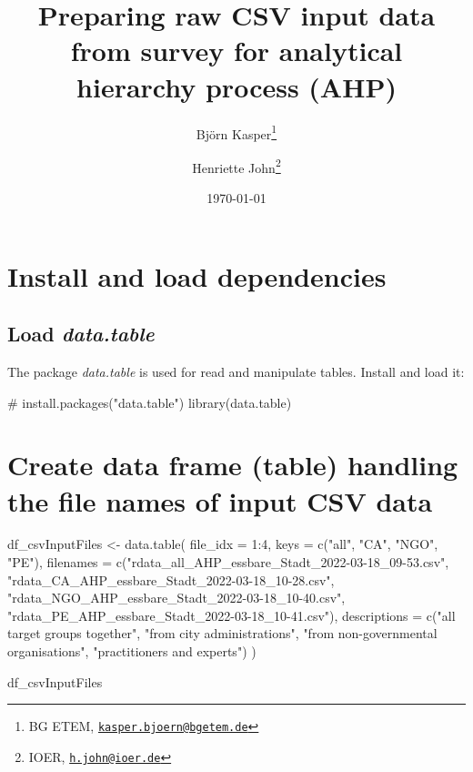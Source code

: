 \documentclass[
]{article}
\title{Preparing raw CSV input data from survey for analytical hierarchy
process (AHP)}
\author{Björn Kasper\footnote{BG ETEM,
  \href{mailto:kasper.bjoern@bgetem.de}{\nolinkurl{kasper.bjoern@bgetem.de}}} \and Henriette
John\footnote{IOER,
  \href{mailto:h.john@ioer.de}{\nolinkurl{h.john@ioer.de}}}}
\date{\today}
\newenvironment{Shaded}{\begin{snugshade}}{\end{snugshade}}
\newcommand{\AttributeTok}[1]{\textcolor[rgb]{0.00,0.34,0.68}{#1}}
\newcommand{\CommentTok}[1]{\textcolor[rgb]{0.54,0.53,0.53}{#1}}
\newcommand{\DecValTok}[1]{\textcolor[rgb]{0.69,0.50,0.00}{#1}}
\newcommand{\FunctionTok}[1]{\textcolor[rgb]{0.39,0.29,0.61}{#1}}
\newcommand{\NormalTok}[1]{\textcolor[rgb]{0.12,0.11,0.11}{#1}}
\newcommand{\OtherTok}[1]{\textcolor[rgb]{0.00,0.43,0.16}{#1}}
\newcommand{\SpecialCharTok}[1]{\textcolor[rgb]{0.24,0.68,0.91}{#1}}
\newcommand{\StringTok}[1]{\textcolor[rgb]{0.75,0.01,0.01}{#1}}
\begin{document}
\maketitle

{
\setcounter{tocdepth}{2}
\tableofcontents
}
\hypertarget{install-and-load-dependencies}{%
\section{Install and load
dependencies}\label{install-and-load-dependencies}}

\hypertarget{load-data.table}{%
\subsection{\texorpdfstring{Load
\emph{data.table}}{Load data.table}}\label{load-data.table}}

The package \emph{data.table} is used for read and manipulate tables.
Install and load it:

\begin{Shaded}
\begin{Highlighting}[]
\CommentTok{\# install.packages("data.table")}
\FunctionTok{library}\NormalTok{(data.table)}
\end{Highlighting}
\end{Shaded}

\hypertarget{create-data-frame-table-handling-the-file-names-of-input-csv-data}{%
\section{Create data frame (table) handling the file names of input CSV
data}\label{create-data-frame-table-handling-the-file-names-of-input-csv-data}}

\begin{Shaded}
\begin{Highlighting}[]
\NormalTok{df\_csvInputFiles }\OtherTok{\textless{}{-}} \FunctionTok{data.table}\NormalTok{(}
  \AttributeTok{file\_idx =} \DecValTok{1}\SpecialCharTok{:}\DecValTok{4}\NormalTok{,}
  \AttributeTok{keys =} \FunctionTok{c}\NormalTok{(}\StringTok{"all"}\NormalTok{, }\StringTok{"CA"}\NormalTok{, }\StringTok{"NGO"}\NormalTok{, }\StringTok{"PE"}\NormalTok{),}
  \AttributeTok{filenames =} \FunctionTok{c}\NormalTok{(}\StringTok{"rdata\_all\_AHP\_essbare\_Stadt\_2022{-}03{-}18\_09{-}53.csv"}\NormalTok{,}
               \StringTok{"rdata\_CA\_AHP\_essbare\_Stadt\_2022{-}03{-}18\_10{-}28.csv"}\NormalTok{,}
               \StringTok{"rdata\_NGO\_AHP\_essbare\_Stadt\_2022{-}03{-}18\_10{-}40.csv"}\NormalTok{,}
               \StringTok{"rdata\_PE\_AHP\_essbare\_Stadt\_2022{-}03{-}18\_10{-}41.csv"}\NormalTok{),}
  \AttributeTok{descriptions =} \FunctionTok{c}\NormalTok{(}\StringTok{"all target groups together"}\NormalTok{,}
                   \StringTok{"from city administrations"}\NormalTok{,}
                   \StringTok{"from non{-}governmental organisations"}\NormalTok{,}
                   \StringTok{"practitioners and experts"}\NormalTok{)}
\NormalTok{)}

\NormalTok{df\_csvInputFiles}
\end{Highlighting}
\end{Shaded}
\end{document}
